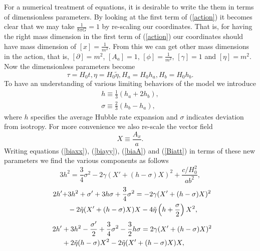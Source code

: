 \documentclass[%
 reprint,
 amsmath,amssymb,
 aps,
]{revtex4-1}
\begin{document}
For a numerical treatment of equations, it is desirable to write the them in terms of dimensionless parameters. By looking at the first term of (\ref{action}) it becomes clear that we may take $\frac{1}{8\pi G}=1$  by re-scaling our coordinates. That is, for having the right mass dimension in the first term of (\ref{action}) our coordinates should have mass dimension of $[x]=\frac{1}{m^2}$. From this we can get other mass dimensions in the action, that is, $[\partial]=m^2$, $[A_a]=1$, $[\phi]=\frac{1}{m^2}$, $[\gamma]=1$ and $[\eta]=m^2$. Now the dimensionless parameters become
\begin{equation}
\tau=H_0 t, \eta=H_0\tilde{\eta}, H_a=H_0 h_a, H_b=H_0 h_b.
\end{equation}
To have an understanding of various limiting behaviors of the model we introduce
\begin{eqnarray}
h\equiv\frac{1}{3}(h_a+2h_b),\\
\sigma\equiv\frac{2}{3}(h_b-h_a),
\end{eqnarray}
where $h$ specifies the average Hubble rate expansion and $\sigma$ indicates deviation from isotropy. For more convenience we also re-scale the vector field
\begin{equation}
X\equiv\frac{A_x}{a}.
\end{equation}
Writing  equations (\ref{biaxx}), (\ref{biayy}), (\ref{biaA}) and (\ref{Biatt}) in terms of these new parameters we find the various components as follows
\begin{equation}\label{eqtt}
3h^2=\frac{3}{4}\sigma^2-2\gamma (X'+(h-\sigma)X)^2+\frac{c/H_0^2}{ab^2},
\end{equation}
\begin{equation}\label{eqxx}
\begin{split}
\hspace{2mm}2h'+&3h^2+\sigma'+3h\sigma+\frac{3}{4}\sigma^2=-2\gamma (X'+(h-\sigma)X)^2\\
&-2\tilde{\eta} (X'+(h-\sigma)X)X-4\tilde{\eta}\left(h+\frac{\sigma}{2}\right)X^2,
\end{split}
\end{equation}
\begin{equation}\label{eqyy}
\begin{split}
\hspace{2mm}2h'&+3h^2-\frac{\sigma'}{2}+\frac{3}{4}\sigma^2-\frac{3}{2}h\sigma=2\gamma (X'+(h-\sigma)X)^2\\
&+2\tilde{\eta}(h-\sigma)X^2-2\tilde{\eta} (X'+(h-\sigma)X)X,
\end{split}
\end{equation}
\end{document}
